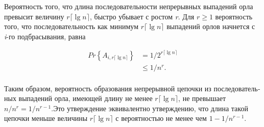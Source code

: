 \documentclass[11pt]{article}
\begin{document}
Вероятность того, что длина последовательности непрерывных выпадений ор­ла превысит величину $r \lceil\lg n\rceil$, быстро убывает с ростом \textit{r}. Для $r \geq 1$  вероятность того, что последовательность как минимум $r \lceil\lg n\rceil$ выпадений орлов начнется с \textit{i}-го подбрасывания, равна 

\begin{align*}
Pr \left\{A_{i, r \lceil\lg n\rceil}\right\} & = 1/2^{r \lceil\lg n\rceil} \\
& \leq 1/n^{r}.
\end{align*}
\\
Таким образом, вероятность образования непрерывной цепочки из последователь­ных выпадений орла, имеющей длину не менее $r \lceil\lg n\rceil$, не превышает $n/n^{r} = 1/n^{r-1}$.Это утверждение эквивалентно утверждению, что длина такой цепочки меньше величины $r \lceil\lg n\rceil$ с вероятностью не менее чем $1 - 1/n^{r-1}$.
\end{document}
